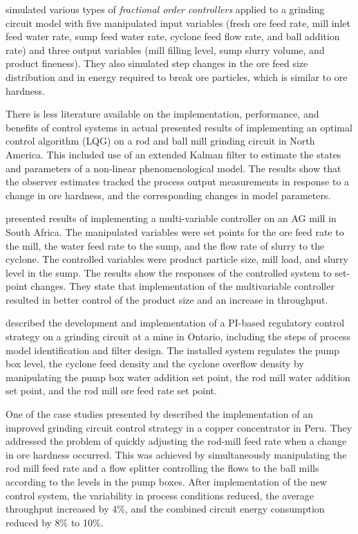 \cite{aguila-camacho_control_2017} simulated various types of \textit{fractional order controllers} applied to a grinding circuit model with five manipulated input variables (fresh ore feed rate, mill inlet feed water rate, sump feed water rate, cyclone feed flow rate, and ball addition rate) and three output variables (mill filling level, sump slurry volume, and product fineness). They also simulated step changes in the ore feed size distribution and in energy required to break ore particles, which is similar to ore hardness.

There is less literature available on the implementation, performance, and benefits of control systems in actual \cite{herbst_optimal_1988} presented results of implementing an optimal control algorithm (\gls{LQG}) on a rod and ball mill grinding circuit in North America. This included use of an extended Kalman filter to estimate the states and parameters of a non-linear phenomenological model. The results show that the observer estimates tracked the process output measurements in response to a change in ore hardness, and the corresponding changes in model parameters.

\cite{hulbert_multivariable_1990} presented results of implementing a multi-variable controller on an AG mill in South Africa. The manipulated variables were set points for the ore feed rate to the mill, the water feed rate to the sump, and the flow rate of slurry to the cyclone. The controlled variables were product particle size, mill load, and slurry level in the sump. The results show the responses of the controlled system to set-point changes. They state that implementation of the multivariable controller resulted in better control of the product size and an increase in throughput.

\cite{desbiens_distributed_1997} described the development and implementation of a \gls{PI}-based regulatory control strategy on a grinding circuit at a mine in Ontario, including the steps of process model identification and filter design. The installed system regulates the pump box level, the cyclone feed density and the cyclone overflow density by manipulating the pump box water addition set point, the rod mill water addition set point, and the rod mill ore feed rate set point.

One of the case studies presented by \cite{desbiens_using_2008} described the implementation of an improved grinding circuit control strategy in a copper concentrator in Peru. They addressed the problem of quickly adjusting the rod-mill feed rate when a change in ore hardness occurred. This was achieved by simultaneously manipulating the rod mill feed rate and a flow splitter controlling the flows to the ball mills according to the levels in the pump boxes. After implementation of the new control system, the variability in process conditions reduced, the average throughput increased by 4\%, and the combined circuit energy consumption reduced by 8\% to 10\%.

